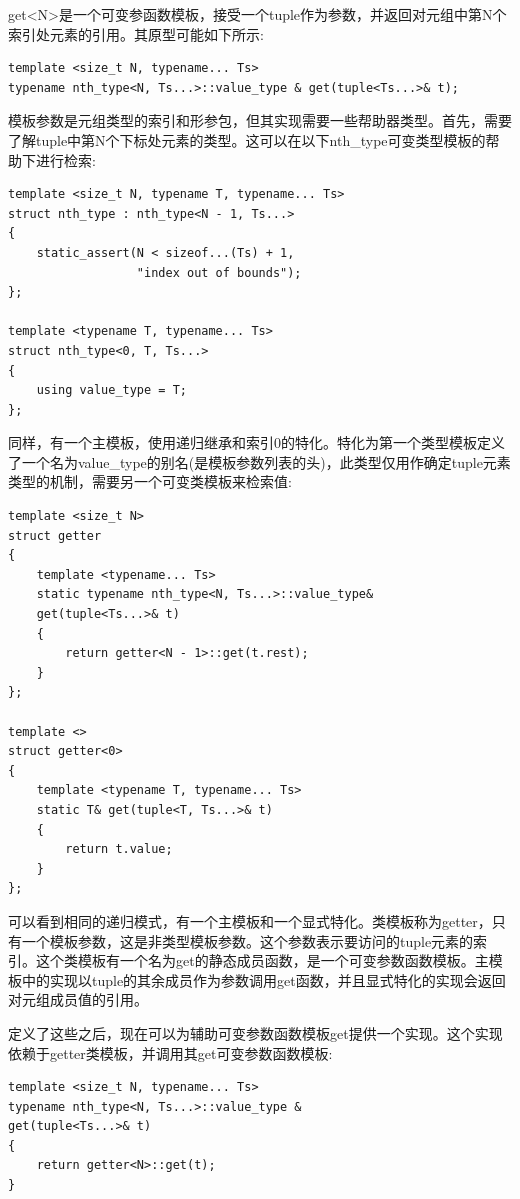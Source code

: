 get<N>是一个可变参函数模板，接受一个tuple作为参数，并返回对元组中第N个索引处元素的引用。其原型可能如下所示:

\begin{lstlisting}[style=styleCXX]
template <size_t N, typename... Ts>
typename nth_type<N, Ts...>::value_type & get(tuple<Ts...>& t);
\end{lstlisting}

模板参数是元组类型的索引和形参包，但其实现需要一些帮助器类型。首先，需要了解tuple中第N个下标处元素的类型。这可以在以下nth\_type可变类型模板的帮助下进行检索:

\begin{lstlisting}[style=styleCXX]
template <size_t N, typename T, typename... Ts>
struct nth_type : nth_type<N - 1, Ts...>
{
	static_assert(N < sizeof...(Ts) + 1,
	              "index out of bounds");
};

template <typename T, typename... Ts>
struct nth_type<0, T, Ts...>
{
	using value_type = T;
};
\end{lstlisting}

同样，有一个主模板，使用递归继承和索引0的特化。特化为第一个类型模板定义了一个名为value\_type的别名(是模板参数列表的头)，此类型仅用作确定tuple元素类型的机制，需要另一个可变类模板来检索值:

\begin{lstlisting}[style=styleCXX]
template <size_t N>
struct getter
{
	template <typename... Ts>
	static typename nth_type<N, Ts...>::value_type&
	get(tuple<Ts...>& t)
	{
		return getter<N - 1>::get(t.rest);
	}
};

template <>
struct getter<0>
{
	template <typename T, typename... Ts>
	static T& get(tuple<T, Ts...>& t)
	{
		return t.value;
	}
};
\end{lstlisting}

可以看到相同的递归模式，有一个主模板和一个显式特化。类模板称为getter，只有一个模板参数，这是非类型模板参数。这个参数表示要访问的tuple元素的索引。这个类模板有一个名为get的静态成员函数，是一个可变参数函数模板。主模板中的实现以tuple的其余成员作为参数调用get函数，并且显式特化的实现会返回对元组成员值的引用。

定义了这些之后，现在可以为辅助可变参数函数模板get提供一个实现。这个实现依赖于getter类模板，并调用其get可变参数函数模板:

\begin{lstlisting}[style=styleCXX]
template <size_t N, typename... Ts>
typename nth_type<N, Ts...>::value_type &
get(tuple<Ts...>& t)
{
	return getter<N>::get(t);
}
\end{lstlisting}

